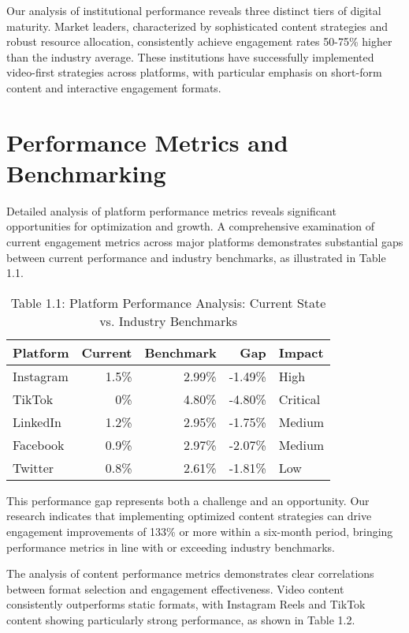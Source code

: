 \documentclass[12pt]{report}
\begin{document}
Our analysis of institutional performance reveals three distinct tiers of digital maturity. Market leaders, characterized by sophisticated content strategies and robust resource allocation, consistently achieve engagement rates 50-75\% higher than the industry average. These institutions have successfully implemented video-first strategies across platforms, with particular emphasis on short-form content and interactive engagement formats.

\section{Performance Metrics and Benchmarking}

Detailed analysis of platform performance metrics reveals significant opportunities for optimization and growth. A comprehensive examination of current engagement metrics across major platforms demonstrates substantial gaps between current performance and industry benchmarks, as illustrated in Table 1.1.

\begin{table}[h]
\centering
\caption{Table 1.1: Platform Performance Analysis: Current State vs. Industry Benchmarks}
\begin{tabular}{@{}lrrrl@{}}
\toprule
\textbf{Platform} & \textbf{Current} & \textbf{Benchmark} & \textbf{Gap} & \textbf{Impact} \\
\midrule
Instagram & 1.5\% & 2.99\% & -1.49\% & High \\
TikTok & 0\% & 4.80\% & -4.80\% & Critical \\
LinkedIn & 1.2\% & 2.95\% & -1.75\% & Medium \\
Facebook & 0.9\% & 2.97\% & -2.07\% & Medium \\
Twitter & 0.8\% & 2.61\% & -1.81\% & Low \\
\bottomrule
\end{tabular}
\end{table}

This performance gap represents both a challenge and an opportunity. Our research indicates that implementing optimized content strategies can drive engagement improvements of 133\% or more within a six-month period, bringing performance metrics in line with or exceeding industry benchmarks.

The analysis of content performance metrics demonstrates clear correlations between format selection and engagement effectiveness. Video content consistently outperforms static formats, with Instagram Reels and TikTok content showing particularly strong performance, as shown in Table 1.2.
\end{document}
